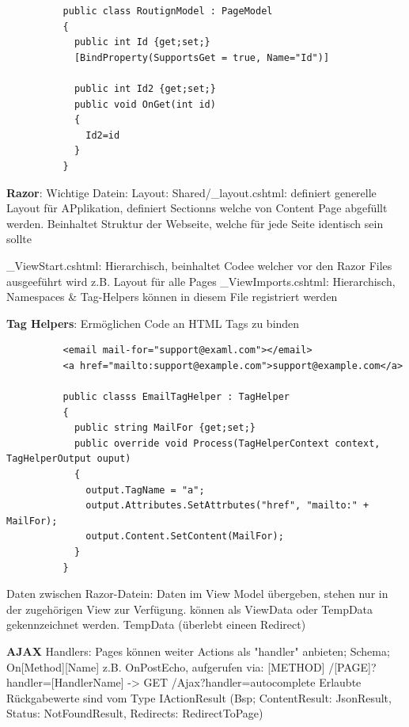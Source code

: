 \documentclass[10pt,landscape]{article}
\begin{document}
\begin{multicols}{2}
\begin{lstlisting}
          public class RoutignModel : PageModel
          {
            public int Id {get;set;}
            [BindProperty(SupportsGet = true, Name="Id")]

            public int Id2 {get;set;}
            public void OnGet(int id)
            {
              Id2=id
            }
          }
        \end{lstlisting}
        \textbf{Razor}: Wichtige Datein: Layout: Shared/\_layout.cshtml: definiert generelle Layout für APplikation, definiert Sectionns welche von Content Page abgefüllt werden.
        Beinhaltet Struktur der Webseite, welche für jede Seite identisch sein sollte

        \_ViewStart.cshtml: Hierarchisch, beinhaltet Codee welcher vor den Razor Files ausgeeführt wird z.B. Layout für alle Pages
        \_ViewImports.cshtml: Hierarchisch, Namespaces \& Tag-Helpers können in diesem File registriert werden

        \textbf{Tag Helpers}: Ermöglichen Code an HTML Tags zu binden
        \begin{lstlisting}
          <email mail-for="support@examl.com"></email>
          <a href="mailto:support@example.com">support@example.com</a>

          public classs EmailTagHelper : TagHelper 
          {
            public string MailFor {get;set;}
            public override void Process(TagHelperContext context, TagHelperOutput ouput)
            {
              output.TagName = "a";
              output.Attributes.SetAttrbutes("href", "mailto:" + MailFor);
              output.Content.SetContent(MailFor);
            }
          }
        \end{lstlisting}
        Daten zwischen Razor-Datein: Daten im View Model übergeben, stehen nur in der zugehörigen View zur Verfügung. können als ViewData oder TempData gekennzeichnet werden.
        TempData (überlebt eineen Redirect)

        \textbf{AJAX}
        Handlers: Pages können weiter Actions als "handler" anbieten; Schema; On[Method][Name] z.B. OnPostEcho, aufgerufen via: [METHOD] /[PAGE]?handler=[HandlerName] -> GET /Ajax?handler=autocomplete
        Erlaubte Rückgabewerte sind vom Type IActionResult (Bsp; ContentResult: JsonResult, Status: NotFoundResult, Redirects: RedirectToPage)


\end{multicols}
\end{document}
